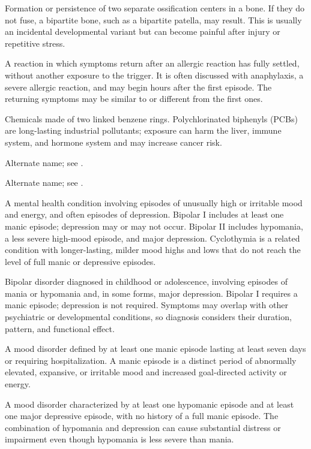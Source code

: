  Formation or persistence of two separate ossification centers in a bone. If they do not fuse, a bipartite bone, such as a bipartite patella, may result. This is usually an incidental developmental variant but can become painful after injury or repetitive stress.

 A reaction in which symptoms return after an allergic
reaction has fully settled, without another exposure to the trigger. It is often
discussed with anaphylaxis, a severe allergic reaction, and may begin hours after
the first episode. The returning symptoms may be similar to or different from
the first ones.

 Chemicals made of two linked benzene rings. Polychlorinated biphenyls (PCBs) are long-lasting industrial pollutants; exposure can harm the liver, immune system, and hormone system and may increase cancer risk.

 Alternate name; see .

 Alternate name; see .

 A mental health condition involving episodes of
unusually high or irritable mood and energy, and often episodes of depression.
Bipolar I includes at least one manic episode; depression may or may not occur.
Bipolar II includes hypomania, a less severe high-mood episode, and major
depression. Cyclothymia is a related condition with longer-lasting, milder mood
highs and lows that do not reach the level of full manic or depressive episodes.

 Bipolar disorder diagnosed in
childhood or adolescence, involving episodes of mania or hypomania and, in
some forms, major depression. Bipolar I requires a manic episode; depression
is not required. Symptoms may overlap with other psychiatric or developmental
conditions, so diagnosis considers their duration, pattern, and functional effect.

 A mood disorder defined by at least one manic episode lasting at least seven days or
requiring hospitalization. A manic episode is a distinct period of abnormally elevated,
expansive, or irritable mood and increased goal-directed activity or energy.

 A mood disorder characterized by at least one hypomanic episode and at least one major depressive episode, with no history of a full manic episode. The combination of hypomania and depression can cause substantial distress or impairment even though hypomania is less severe than mania.

